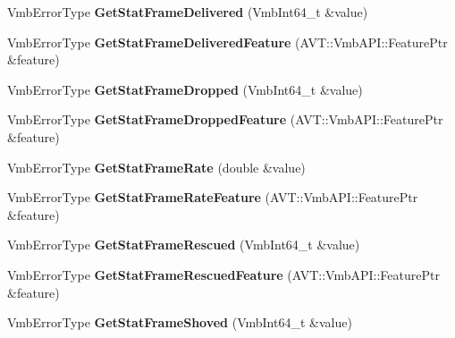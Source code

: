 \begin{DoxyCompactItemize}
\item 
\hypertarget{classMakoCamera_aa9f481496e9a4a2a838e98fd28b77fa0}{Vmb\-Error\-Type {\bfseries Get\-Stat\-Frame\-Delivered} (Vmb\-Int64\-\_\-t \&value)}\label{classMakoCamera_aa9f481496e9a4a2a838e98fd28b77fa0}

\item 
\hypertarget{classMakoCamera_a9fcef15b63d9641cb8ea6055bf6b2818}{Vmb\-Error\-Type {\bfseries Get\-Stat\-Frame\-Delivered\-Feature} (A\-V\-T\-::\-Vmb\-A\-P\-I\-::\-Feature\-Ptr \&feature)}\label{classMakoCamera_a9fcef15b63d9641cb8ea6055bf6b2818}

\item 
\hypertarget{classMakoCamera_a26bc0f2ddad9a98660acd3b77706aef6}{Vmb\-Error\-Type {\bfseries Get\-Stat\-Frame\-Dropped} (Vmb\-Int64\-\_\-t \&value)}\label{classMakoCamera_a26bc0f2ddad9a98660acd3b77706aef6}

\item 
\hypertarget{classMakoCamera_a001ebf9bd708bc9f51d2d8726067866e}{Vmb\-Error\-Type {\bfseries Get\-Stat\-Frame\-Dropped\-Feature} (A\-V\-T\-::\-Vmb\-A\-P\-I\-::\-Feature\-Ptr \&feature)}\label{classMakoCamera_a001ebf9bd708bc9f51d2d8726067866e}

\item 
\hypertarget{classMakoCamera_a29e0bd565916c0f127ccddd3bfb07b54}{Vmb\-Error\-Type {\bfseries Get\-Stat\-Frame\-Rate} (double \&value)}\label{classMakoCamera_a29e0bd565916c0f127ccddd3bfb07b54}

\item 
\hypertarget{classMakoCamera_a8829f1fbe934727cdd337684f2175b33}{Vmb\-Error\-Type {\bfseries Get\-Stat\-Frame\-Rate\-Feature} (A\-V\-T\-::\-Vmb\-A\-P\-I\-::\-Feature\-Ptr \&feature)}\label{classMakoCamera_a8829f1fbe934727cdd337684f2175b33}

\item 
\hypertarget{classMakoCamera_abd8c9a376a8002c81bc206cdd5f17733}{Vmb\-Error\-Type {\bfseries Get\-Stat\-Frame\-Rescued} (Vmb\-Int64\-\_\-t \&value)}\label{classMakoCamera_abd8c9a376a8002c81bc206cdd5f17733}

\item 
\hypertarget{classMakoCamera_ab1409dbefbb28f30d431f97e196bad4a}{Vmb\-Error\-Type {\bfseries Get\-Stat\-Frame\-Rescued\-Feature} (A\-V\-T\-::\-Vmb\-A\-P\-I\-::\-Feature\-Ptr \&feature)}\label{classMakoCamera_ab1409dbefbb28f30d431f97e196bad4a}

\item 
\hypertarget{classMakoCamera_a3da78ac5e6af13bbcc15070fb48bc7d8}{Vmb\-Error\-Type {\bfseries Get\-Stat\-Frame\-Shoved} (Vmb\-Int64\-\_\-t \&value)}\label{classMakoCamera_a3da78ac5e6af13bbcc15070fb48bc7d8}


\end{DoxyCompactItemize}
